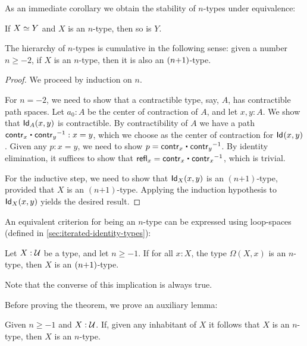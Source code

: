As an immediate corollary we obtain the stability of $n$-types under equivalence:

\begin{cor}\label{cor:preservation-hlevels-weq}
 If $\eqv{X}{Y}$ and $X$ is an $n$-type, then so is $Y$.
\end{cor}

\begin{thm}\label{thm:hlevel-cumulative}
 The hierarchy of $n$-types is cumulative in the following sense:
   given a number $n \geq -2$, if $X$ is an $n$-type, then it is also an $(n\mbox{\rm{+}}1)$-type.
\end{thm}

\begin{proof}
 We proceed by induction on $n$.

 For $n = -2$, we need to show that a contractible type, say, $A$, has contractible path spaces.
       Let $a_0: A$ be the center of contraction of $A$, and let $x, y : A$. We show that $\idtype[A]{x}{y}$
       is contractible.
       By contractibility of $A$ we have a path $\contr_x \ct \opp{\contr_y} : x = y$, which we choose as
       the center of contraction for $\idtype{x}{y}$.
       Given any $p : x = y$, we need to show $p = \contr_x \ct \opp{\contr_y}$.
           By identity elimination, it suffices to show that
        $\refl{x} = \contr_x \ct \opp{\contr_x}$, which is trivial.

 For the inductive step, we need to show that $\idtype[X]{x}{y}$ is an $(n\mbox{+}1)$-type, provided
          that $X$ is an $(n\mbox{+}1)$-type. Applying the induction hypothesis to $\idtype[X]{x}{y}$
         yields the desired result.
\end{proof}

An equivalent criterion for being an $n$-type can be expressed using
loop-spaces (defined in \cref{sec:iterated-identity-types}):

\begin{thm}\label{thm:hlevel-loops}
 Let $X : \type$ be a type, and let $n\geq -1$.
  If for all $x : X$, the type $\Omega(X, x)$ is an $n$-type,
       then $X$ is an $(n\mbox{\rm{+}}1)$-type.
\end{thm}

Note that the converse of this implication is always true.

Before proving the theorem, we prove an auxiliary lemma:

\begin{lem}\label{lem:hlevel-if-inhab-hlevel}
 Given $n \geq -1$ and $X : \type$. If, given any inhabitant of $X$ it follows that $X$ is
   an $n$-type, then $X$ is an $n$-type.
\end{lem}


